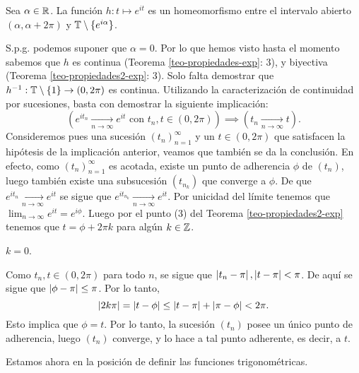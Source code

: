 \begin{theo}
    Sea \(\alpha \in \mathbb{R}\). La función \(h: t \mapsto e^{it}\) es un homeomorfismo entre el intervalo abierto \((\alpha, \alpha + 2\pi)\) y 
    \(\mathbb{T} \setminus \{e^{i\alpha}\}\).
\end{theo}
\begin{dem}
    S.p.g. podemos suponer que \(\alpha = 0\). Por lo que hemos visto hasta el momento sabemos que \(h\) es continua (Teorema \ref{teo-propiedades-exp}: 3), 
    y biyectiva (Teorema \ref{teo-propiedades2-exp}: 3). Solo falta demostrar que \(h^{-1} : \mathbb{T}\setminus \{1\} \rightarrow (0, 2\pi)\) es continua. 
    Utilizando la caracterización de continuidad por sucesiones, basta con demostrar la siguiente implicación:
    \[
        \left(e^{it_n}\xrightarrow[n\to \infty]{} e^{it}\,\, \text{con } t_n, t \in (0, 2\pi)\right) \implies (t_n \xrightarrow[n\to \infty]{} t).
    \]
    Consideremos pues una sucesión \((t_n)_{n=1}^{\infty}\) y un \(t\in (0,2\pi)\) que satisfacen la hipótesis de la implicación anterior, 
    veamos que también se da la conclusión. En efecto, como \((t_n)_{n=1}^{\infty}\) es acotada, existe un punto de adherencia \(\phi\) de \((t_n)\), 
    luego también existe una subsucesión \((t_{n_k})\) que converge a \(\phi\). De que \(e^{it_n}\xrightarrow[n\to \infty]{} e^{it}\) se sigue que 
    \(e^{it_{n_k}}\xrightarrow[n\to \infty]{} e^{it}\). Por unicidad del límite tenemos que \(\lim_{n \to \infty}e^{it} = e^{i\phi} \). Luego por el 
    punto (3) del Teorema \ref{teo-propiedades2-exp} tenemos que \(t= \phi + 2\pi k\) para algún \(k\in \mathbb{Z}\). 
    \begin{pd}
    \(k=0\).
    \end{pd}
    Como \(t_n, t \in (0, 2 \pi )\) para todo \(n\), se sigue que \(\left\lvert t_n - \pi\right\rvert, \left\lvert t - \pi\right\rvert < \pi\). De aquí se sigue que \(\left\lvert\phi - \pi\right\rvert\leq \pi\). Por lo tanto,
    \[
    \left\lvert2k\pi\right\rvert = \left\lvert t - \phi\right\rvert \leq \left\lvert t-\pi\right\rvert + \left\lvert\pi - \phi\right\rvert< 2\pi.
    \]
    Esto implica que \(\phi = t\). Por lo tanto, la sucesión \((t_n)\) posee un único punto de adherencia, luego \((t_n)\) converge, y lo hace a tal punto adherente, es decir,
    a \(t\).
\end{dem}

Estamos ahora en la posición de definir las funciones trigonométricas. 

